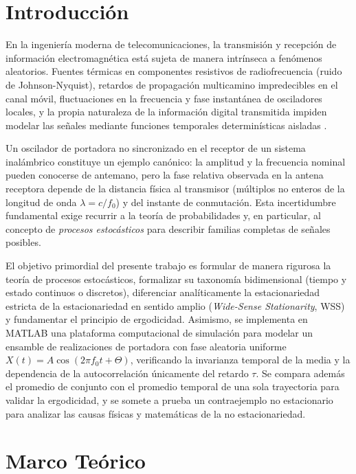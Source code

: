 \documentclass[conference]{IEEEtran}
\begin{document}
\section{Introducción}
En la ingeniería moderna de telecomunicaciones, la transmisión y recepción de información electromagnética está sujeta de manera intrínseca a fenómenos aleatorios. Fuentes térmicas en componentes resistivos de radiofrecuencia (ruido de Johnson-Nyquist), retardos de propagación multicamino impredecibles en el canal móvil, fluctuaciones en la frecuencia y fase instantánea de osciladores locales, y la propia naturaleza de la información digital transmitida impiden modelar las señales mediante funciones temporales determinísticas aisladas \cite{leon2008, proakis2008}.

Un oscilador de portadora no sincronizado en el receptor de un sistema inalámbrico constituye un ejemplo canónico: la amplitud y la frecuencia nominal pueden conocerse de antemano, pero la fase relativa observada en la antena receptora depende de la distancia física al transmisor (múltiplos no enteros de la longitud de onda $\lambda = c / f_0$) y del instante de conmutación. Esta incertidumbre fundamental exige recurrir a la teoría de probabilidades y, en particular, al concepto de \textit{procesos estocásticos} para describir familias completas de señales posibles.

El objetivo primordial del presente trabajo es formular de manera rigurosa la teoría de procesos estocásticos, formalizar su taxonomía bidimensional (tiempo y estado continuos o discretos), diferenciar analíticamente la estacionariedad estricta de la estacionariedad en sentido amplio (\textit{Wide-Sense Stationarity}, WSS) y fundamentar el principio de ergodicidad. Asimismo, se implementa en MATLAB una plataforma computacional de simulación para modelar un ensamble de realizaciones de portadora con fase aleatoria uniforme $X(t) = A\cos(2\pi f_0 t + \Theta)$, verificando la invarianza temporal de la media y la dependencia de la autocorrelación únicamente del retardo $\tau$. Se compara además el promedio de conjunto con el promedio temporal de una sola trayectoria para validar la ergodicidad, y se somete a prueba un contraejemplo no estacionario para analizar las causas físicas y matemáticas de la no estacionariedad.

\section{Marco Teórico}
\end{document}
